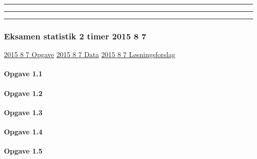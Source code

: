 \documentclass[]{book}
\let\oldparagraph\paragraph
\renewcommand{\paragraph}[1]{\oldparagraph{#1}\mbox{}}
\begin{document}
\begin{center}\rule{0.5\linewidth}{\linethickness}\end{center}

\begin{center}\rule{0.5\linewidth}{\linethickness}\end{center}

\begin{center}\rule{0.5\linewidth}{\linethickness}\end{center}

\hypertarget{eksamen-statistik-2-timer-2015-8-7}{%
\subsubsection{Eksamen statistik 2 timer 2015 8
7}\label{eksamen-statistik-2-timer-2015-8-7}}

\href{https://www.dropbox.com/s/dwbpp3ykq17tbvb/2015\%208\%207\%201.reeksamen.pdf?dl=1}{2015
8 7 Opgave}
\href{https://www.dropbox.com/s/45d1xkhjp3c0owh/2015\%208\%207\%20Data.xlsx?dl=1}{2015
8 7 Data}
\href{https://www.dropbox.com/s/9nhbc21yth3si6o/2015\%208\%207\%20Freestat\%20skabelon\%20l\%C3\%B8sning.docx?dl=1}{2015
8 7 Løsningsforslag}

\hypertarget{opgave-1.1}{%
\paragraph{Opgave 1.1}\label{opgave-1.1}}

\hypertarget{opgave-1.2}{%
\paragraph{Opgave 1.2}\label{opgave-1.2}}

\hypertarget{opgave-1.3}{%
\paragraph{Opgave 1.3}\label{opgave-1.3}}

\hypertarget{opgave-1.4}{%
\paragraph{Opgave 1.4}\label{opgave-1.4}}

\hypertarget{opgave-1.5}{%
\paragraph{Opgave 1.5}\label{opgave-1.5}}
\end{document}
